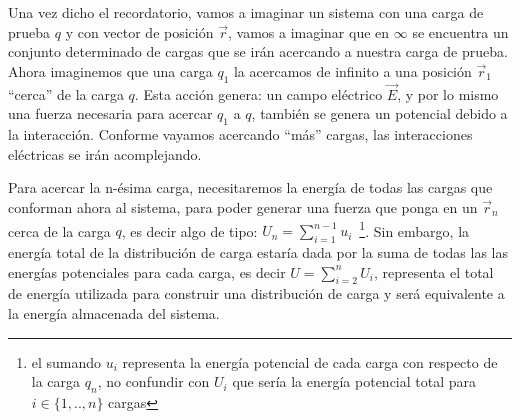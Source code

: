 \documentclass[11pt,a4paper]{article}
\begin{document}
Una vez dicho el recordatorio, vamos a imaginar un sistema con una carga de prueba $q$ y con vector de posición $\vec{r}$, vamos a imaginar que en $\infty$ se encuentra un conjunto determinado de cargas que se irán acercando a nuestra carga de prueba. Ahora imaginemos que una carga $q_1$ la acercamos de infinito a una posición $\vec{r}_1$ “cerca'' de la carga $q$. Esta acción genera: un campo eléctrico $\vec{E}$, y por lo mismo una fuerza necesaria para acercar $q_1$ a $q$, también se genera un potencial debido a la interacción. Conforme vayamos acercando “más'' cargas, las interacciones eléctricas se irán acomplejando.

Para acercar la n-ésima carga, necesitaremos la energía de todas las cargas que conforman ahora al sistema, para poder generar una fuerza que ponga en un $\vec{r}_n$ cerca de la carga $q$, es decir algo de tipo: $U_n=\sum_{i=1}^{n-1}u_i$\ \footnote{el sumando $u_i$ representa la energía potencial de cada carga con respecto de la carga $q_n$, no confundir con $U_i$ que sería la energía potencial total para $i\in\{1,..,n\}$ cargas}.  Sin embargo, la energía total de la distribución de carga estaría dada por la suma de todas las las energías potenciales para cada carga, es decir $U=\sum_{i=2}^{n}U_i$, representa el total de energía utilizada para construir una distribución de carga y será equivalente a la energía almacenada del sistema.
\end{document}
